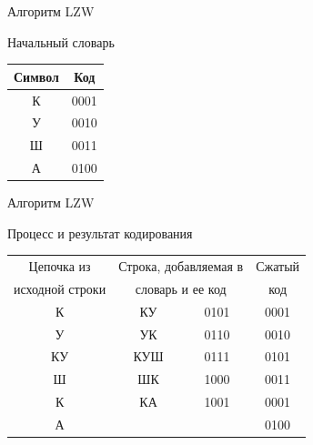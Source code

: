 \documentclass[11pt]{beamer}
\begin{document}
\begin{frame}{Алгоритм LZW}
\begin{block}{Начальный словарь}
\renewcommand{\arraystretch}{1.5}
\begin{table}[H]
\begin{center}
	\begin{tabular}{|c|c|}
		\hline	
		Символ & Код \\
		\hline
		  К    & 0001 \\
		\hline
		  У	   & 0010 \\
		\hline  
	  	  Ш	   & 0011 \\
		\hline  	
		  А    & 0100 \\
		\hline
	\end{tabular}
\end{center}
\end{table}
\end{block}				
\end{frame}


 
\begin{frame}{Алгоритм LZW}
\begin{block}{Процесс и результат кодирования}
\begin{table}[H]
\begin{center}
	\begin{tabular}{|c|c|c|c|}
		\hline	
		  Цепочка из & \multicolumn{2}{|c|}{Строка, добавляемая в} & Сжатый \\
		  исходной строки & \multicolumn{2}{|c|}{словарь и ее код} & код \\
		\hline
	  	  К    & КУ & 0101 & 0001 \\
		\hline
		  У	   & УК & 0110 & 0010 \\
		\hline  
		  КУ   & КУШ & 0111 & 0101 \\
		\hline  	
		  Ш    & ШК & 1000 & 0011 \\
		\hline
		  К    & КА & 1001 & 0001 \\
		\hline
		  А    &    &      & 0100 \\
		\hline
	\end{tabular}
\end{center}
\end{table}
\end{block}				
\end{frame} 
 
\end{document}
